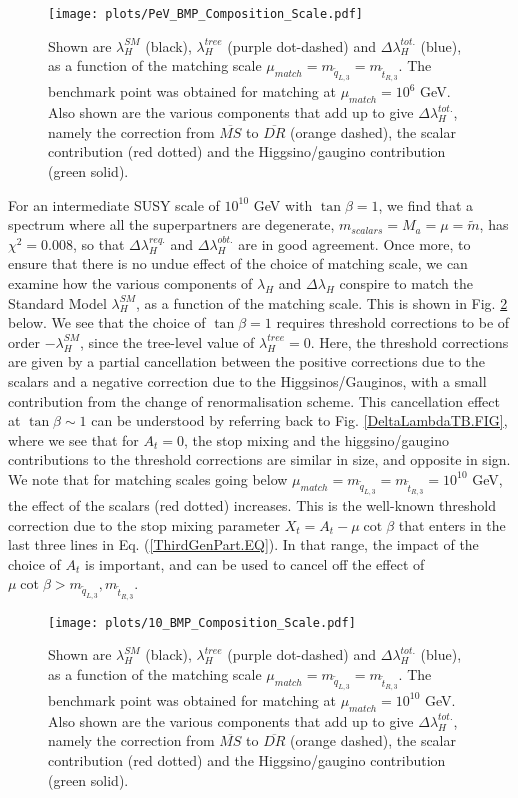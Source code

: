 \documentclass[12pt]{article}
\newcommand{\sq}{\tilde{q}}
\newcommand{\mStL}{m_{\sq_{L,3}}}
\newcommand{\mStR}{m_{\tilde{t}_{R,3}}}
\newcommand{\MS}{\overline{MS}}
\newcommand{\DR}{\overline{DR}}
\newcommand{\mS}{\tilde{m}}
\begin{document}
\begin{figure}[t]
\centering
\texttt{[image: plots/PeV\_BMP\_Composition\_Scale.pdf]}
\caption{Shown are $\lambda_H^{SM}$ (black), $\lambda_H^{tree}$ (purple dot-dashed) and $\Delta\lambda_H^{tot.}$ (blue), as a function of the matching scale $\mu_{match} = \mStL =\mStR$. The benchmark point was obtained for matching at $\mu_{match}=10^6$ GeV. Also shown are the various components that add up to give $\Delta\lambda_H^{tot.}$, namely the correction from $\MS$ to $\DR$ (orange dashed), the scalar contribution (red dotted) and the Higgsino/gaugino contribution (green solid).}
\label{PeV_matching.FIG}
\end{figure}

For an intermediate SUSY scale of $10^{10}$ GeV with $\tan\beta=1$, we find that a spectrum where all the superpartners are degenerate, $m_{scalars}=M_a =\mu=\mS$, has $\chi^2=0.008$, so that $\Delta\lambda_H^{req.}$ and $\Delta\lambda_H^{obt.}$ are in good agreement. Once more, to ensure that there is no undue effect of the choice of matching scale, we can examine how the various components of $\lambda_H$ and $\Delta\lambda_H$ conspire to match the Standard Model $\lambda_H^{SM}$, as a function of the matching scale. This is shown in Fig. \ref{10_matching.FIG} below. We see that the choice of $\tan\beta=1$ requires threshold corrections to be of order $-\lambda^{SM}_H$, since the tree-level value of $\lambda_H^{tree}=0$. Here, the threshold corrections are given by a partial cancellation between the positive corrections due to the scalars and a negative correction due to the Higgsinos/Gauginos, with a small contribution from the change of renormalisation scheme. This cancellation effect at $\tan\beta \sim 1$ can be understood by referring back to Fig. \ref{DeltaLambdaTB.FIG}, where we see that for $A_t = 0$, the stop mixing and the higgsino/gaugino contributions to the threshold corrections are similar in size, and opposite in sign. We note that for matching scales going below $\mu_{match}= \mStL =\mStR=10^{10}$ GeV, the effect of the scalars (red dotted) increases. This is the well-known threshold correction due to the stop mixing parameter $X_t = A_t - \mu \cot\beta$ that enters in the last three lines in Eq. (\ref{ThirdGenPart.EQ}). In that range, the impact of the choice of $A_t$ is important, and can be used to cancel off the effect of $\mu\cot\beta > \mStL,\mStR$.

\begin{figure}[t]
\centering
\texttt{[image: plots/10\_BMP\_Composition\_Scale.pdf]}
\caption{Shown are $\lambda_H^{SM}$ (black), $\lambda_H^{tree}$ (purple dot-dashed) and $\Delta\lambda_H^{tot.}$ (blue), as a function of the matching scale $\mu_{match} = \mStL =\mStR$. The benchmark point was obtained for matching at $\mu_{match}=10^{10}$ GeV. Also shown are the various components that add up to give $\Delta\lambda_H^{tot.}$, namely the correction from $\MS$ to $\DR$ (orange dashed), the scalar contribution (red dotted) and the Higgsino/gaugino contribution (green solid).}
\label{10_matching.FIG}
\end{figure}
\end{document}
